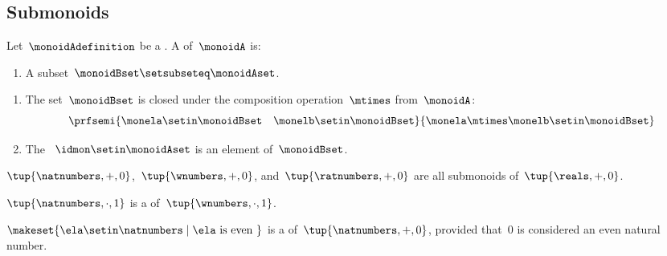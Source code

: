 \subsection{Submonoids}


\begin{definition}[Submonoids]\label{def:submonoids}
    Let~$\monoidAdefinition$ be a .
    A  of~$\monoidA$ is:

    \constit

    \begin{enumerate}
        \item A subset~$\monoidBset \setsubseteq \monoidAset$.
    \end{enumerate}

    \condit

    \begin{enumerate}
        \item The set~$\monoidBset$ is closed under the composition operation~$\mtimes$ from~$\monoidA$:
              \begin{equation}
                  \prfsemi{\monela \setin \monoidBset \quad \monelb \setin \monoidBset}{\monela \mtimes \monelb \setin \monoidBset}
              \end{equation}

        \item The ~$\idmon \setin \monoidAset$ is an element of~$\monoidBset$.
    \end{enumerate}
\end{definition}

\begin{example}
    $\tup{\natnumbers, +, 0}$,~$\tup{\wnumbers, +, 0}$, and~$\tup{\ratnumbers, +, 0}$ are all submonoids of~$\tup{\reals, +, 0}$.
\end{example}

\begin{example}
    $\tup{\natnumbers, \cdot, 1}$  is a  of~$\tup{\wnumbers, \cdot, 1}$.
\end{example}

\begin{example}
    $\makeset{ \ela \setin \natnumbers \mid \ela \text{ is even } }$ is a  of~$\tup{\natnumbers, +, 0}$, provided that~$0$ is considered an even natural number.
\end{example}
